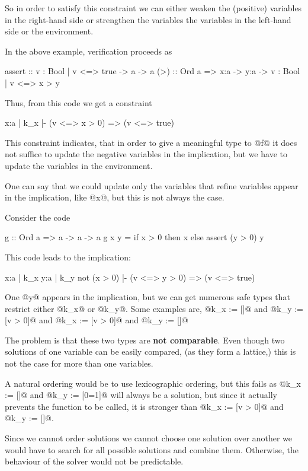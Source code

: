 \documentclass[10pt,a4paper]{article}
\begin{document}
So in order to satisfy this constraint we can either weaken the (positive) variables 
in the right-hand side 
or strengthen the variables the variables in the left-hand side or the environment.

In the above example, verification proceeds as 

\begin{code}
assert :: {v : Bool | v <=> true} -> a -> a
(>) :: Ord a => x:a -> y:a -> {v : Bool | v <=> x > y}
\end{code}

Thus, from this code we get a constraint
\begin{code}
{x:a | k_x}
|-
(v <=> x > 0) => (v <=> true)
\end{code}

This constraint indicates, that in order to give a meaningful type to @f@
it does not suffice to update the negative variables in the implication,
but we have to update the variables in the environment.

One can say that we could update only the variables that refine
variables appear in the implication, like @x@,
but this is not always the case.

Consider the code
\begin{code}
g :: Ord a => a -> a -> a
g x y = if x > 0 then x else assert (y > 0) y
\end{code}

This code leads to the implication:
\begin{code}
{x:a | k_x}
{y:a | k_y}
not (x > 0)
|-
(v <=> y > 0) => (v <=> true)
\end{code}

One @y@ appears in the implication,
but we can get numerous safe types 
that restrict either @k_x@ or @k_y@.
Some examples are,
@k_x := []@ and @k_y := [v > 0]@
and 
@k_x := [v > 0]@ and @k_y := []@

The problem is that these two types are \textbf{not comparable}.
Even though two solutions of one variable can be easily compared, 
(as they form a lattice,) 
this is not the case
for more than one variables.
%

A natural ordering would be to use lexicographic ordering, but this fails
as 
@k_x := []@ and @k_y := [0=1]@
will always be a solution, 
but since it actually prevents the function to be called,
it is stronger than 
@k_x := [v > 0]@ and @k_y := []@.


Since we cannot order solutions
we cannot choose one solution over another
we would have to search for all possible solutions and combine them.
Otherwise, the behaviour of the solver would not be predictable.
\end{document}
